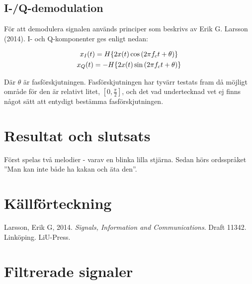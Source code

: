 \documentclass[a4paper,12pt,fleqn]{article}
\begin{document}
\newpage

\subsection{I-/Q-demodulation}

För att demodulera signalen används principer som beskrivs av Erik G. Larsson (2014). I- och Q-komponenter ges enligt nedan: 

\begin{gather}
x_{I}(t) = \Large{H}\{2x(t)\cos{(2{\pi}f_{c}t + \theta)}\} \\
x_{Q}(t) = -\Large{H}\{2x(t)\sin{(2{\pi}f_{c}t + \theta)}\}
\label{equ:iq}
\end{gather}

Där $\theta$ är fasförskjutningen. Fasförskjutningen har tyvärr testats fram då möjligt område för den är relativt litet, $[0,\frac{\pi}{2}]$, och det vad undertecknad vet ej finns något sätt att entydigt bestämma fasförskjutningen. 



\newpage
\section{Resultat och slutsats}

Först spelas två melodier - varav en blinka lilla stjärna. Sedan hörs ordsspråket ''Man kan inte både ha kakan och äta den''.


\newpage
\section{Källförteckning}

Larsson, Erik G, 2014. \textit{Signals, Information and Communications}. Draft 11342. Linköping. LiU-Press.



\newpage
\appendix
\pagestyle{empty}
\section{Filtrerade signaler}
\end{document}

